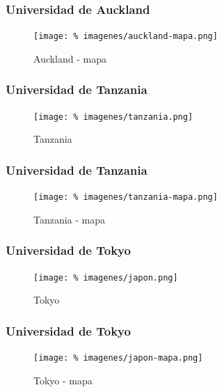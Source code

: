 \documentclass[final,inline,a4paper,narroweqnarray]{ieee}
\let\Oldsubsubsection\subsubsection
\renewcommand{\subsubsection}{\FloatBarrier\Oldsubsubsection}
\begin{document}
\subsubsection{Universidad de Auckland}
\begin{figure}[ht]\begin{center}
   \texttt{[image: \%
    imagenes/auckland-mapa.png]}
    \caption{Auckland - mapa}
    \label{Auckland}
\end{center}\end{figure}

\subsubsection{Universidad de Tanzania}
\begin{figure}[ht]\begin{center}
   \texttt{[image: \%
    imagenes/tanzania.png]}
    \caption{Tanzania}
    \label{Tanzania}
\end{center}\end{figure}

\subsubsection{Universidad de Tanzania}
\begin{figure}[ht]\begin{center}
   \texttt{[image: \%
    imagenes/tanzania-mapa.png]}
    \caption{Tanzania - mapa}
    \label{Tanzania}
\end{center}\end{figure}

\subsubsection{Universidad de Tokyo}
\begin{figure}[ht]\begin{center}
   \texttt{[image: \%
    imagenes/japon.png]}
    \caption{Tokyo}
    \label{Tokyo}
\end{center}\end{figure}

\subsubsection{Universidad de Tokyo}
\begin{figure}[ht]\begin{center}
   \texttt{[image: \%
    imagenes/japon-mapa.png]}
    \caption{Tokyo - mapa}
    \label{Tokyo}
\end{center}\end{figure}
\end{document}
